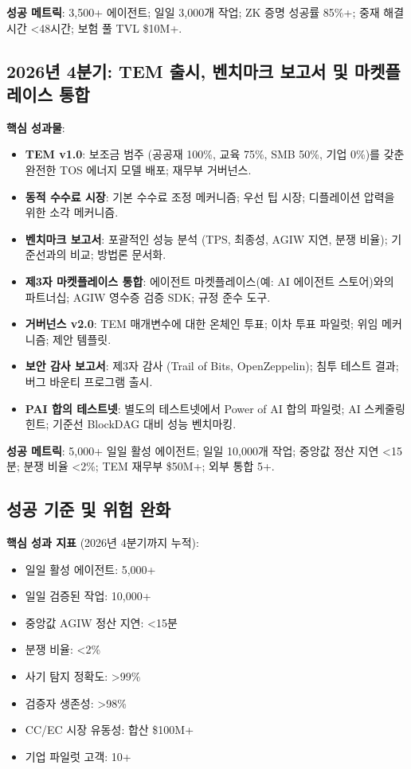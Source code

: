 \documentclass[11pt]{article}
\begin{document}
\textbf{성공 메트릭}: 3,500+ 에이전트; 일일 3,000개 작업; ZK 증명 성공률 85\%+; 중재 해결 시간 <48시간; 보험 풀 TVL \$10M+.

\subsection{2026년 4분기: TEM 출시, 벤치마크 보고서 및 마켓플레이스 통합}

\textbf{핵심 성과물}:
\begin{itemize}[noitemsep]
  \item \textbf{TEM v1.0}: 보조금 범주 (공공재 100\%, 교육 75\%, SMB 50\%, 기업 0\%)를 갖춘 완전한 TOS 에너지 모델 배포; 재무부 거버넌스.
  \item \textbf{동적 수수료 시장}: 기본 수수료 조정 메커니즘; 우선 팁 시장; 디플레이션 압력을 위한 소각 메커니즘.
  \item \textbf{벤치마크 보고서}: 포괄적인 성능 분석 (TPS, 최종성, AGIW 지연, 분쟁 비율); 기준선과의 비교; 방법론 문서화.
  \item \textbf{제3자 마켓플레이스 통합}: 에이전트 마켓플레이스(예: AI 에이전트 스토어)와의 파트너십; AGIW 영수증 검증 SDK; 규정 준수 도구.
  \item \textbf{거버넌스 v2.0}: TEM 매개변수에 대한 온체인 투표; 이차 투표 파일럿; 위임 메커니즘; 제안 템플릿.
  \item \textbf{보안 감사 보고서}: 제3자 감사 (Trail of Bits, OpenZeppelin); 침투 테스트 결과; 버그 바운티 프로그램 출시.
  \item \textbf{PAI 합의 테스트넷}: 별도의 테스트넷에서 Power of AI 합의 파일럿; AI 스케줄링 힌트; 기준선 BlockDAG 대비 성능 벤치마킹.
\end{itemize}

\textbf{성공 메트릭}: 5,000+ 일일 활성 에이전트; 일일 10,000개 작업; 중앙값 정산 지연 <15분; 분쟁 비율 <2\%; TEM 재무부 \$50M+; 외부 통합 5+.

\subsection{성공 기준 및 위험 완화}

\textbf{핵심 성과 지표} (2026년 4분기까지 누적):
\begin{itemize}[noitemsep]
  \item 일일 활성 에이전트: 5,000+
  \item 일일 검증된 작업: 10,000+
  \item 중앙값 AGIW 정산 지연: <15분
  \item 분쟁 비율: <2\%
  \item 사기 탐지 정확도: >99\%
  \item 검증자 생존성: >98\%
  \item CC/EC 시장 유동성: 합산 \$100M+
  \item 기업 파일럿 고객: 10+
\end{itemize}
\end{document}
